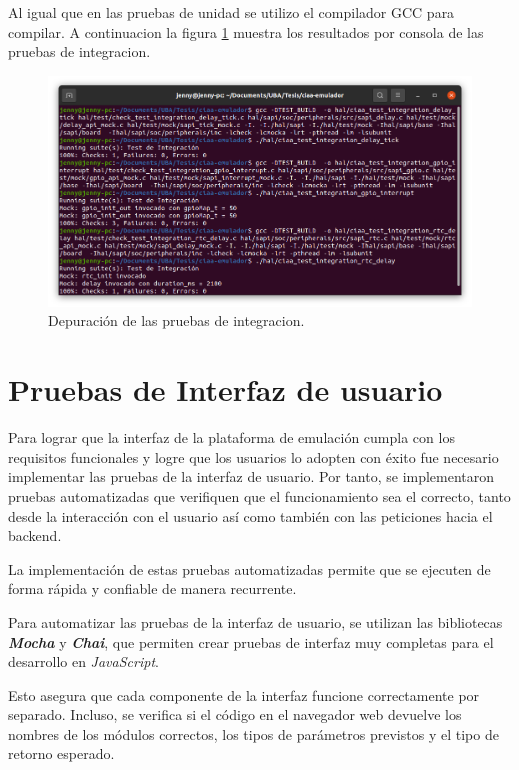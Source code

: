 Al igual que en las pruebas de unidad se utilizo el compilador GCC para compilar. A continuacion la figura \ref{fig:PruebasIntegracion} muestra los resultados por consola de las pruebas de integracion.

\begin{figure}[ht]
	\centering
	\includegraphics[scale=.35]{./Figures/PruebasIntegracion.png}
	\caption{Depuración de las pruebas de integracion.}
	\label{fig:PruebasIntegracion}
\end{figure}

\section{Pruebas de Interfaz de usuario}
\label{sec:Pruebas de Interfaz}

Para lograr que la interfaz de la plataforma de emulación cumpla con los requisitos funcionales y logre que los usuarios lo adopten con éxito fue necesario implementar las pruebas de la interfaz de usuario. Por tanto, se implementaron pruebas automatizadas que verifiquen que el funcionamiento sea el correcto, tanto desde la interacción con el usuario así como también con las peticiones hacia el backend.

La implementación de estas pruebas automatizadas permite que se ejecuten de forma rápida y confiable de manera recurrente. 

Para automatizar las pruebas de la interfaz de usuario, se utilizan las bibliotecas \textit{\textbf{Mocha}} y \textit{\textbf{Chai}}, que permiten crear pruebas de interfaz muy completas para el desarrollo en \textit{JavaScript}.

Esto asegura que cada componente de la interfaz funcione correctamente por separado. Incluso, se verifica si el código en el navegador web devuelve los nombres de los módulos correctos, los tipos de parámetros previstos y el tipo de retorno esperado.

